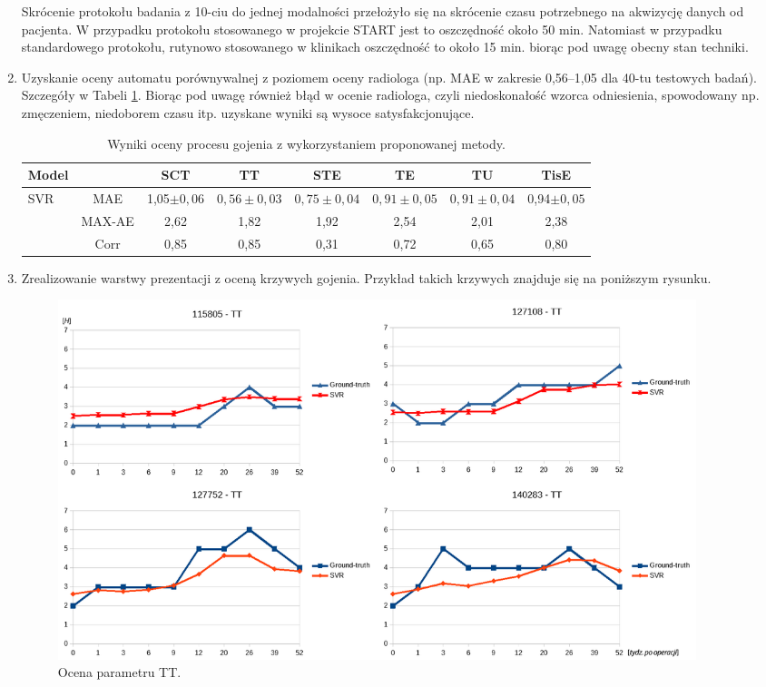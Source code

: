 \begin{enumerate}
	Skrócenie protokołu badania z 10-ciu do jednej modalności przełożyło się \linebreak na skrócenie czasu potrzebnego na akwizycję danych od pacjenta. W przypadku protokołu stosowanego w projekcie START jest to oszczędność około 50 min. Natomiast w przypadku standardowego protokołu, rutynowo stosowanego w klinikach oszczędność to około 15 min. biorąc pod uwagę obecny stan techniki. 
	\item Uzyskanie oceny automatu porównywalnej z poziomem oceny radiologa (np. MAE w zakresie 0,56--1,05 dla 40-tu testowych badań). Szczegóły w Tabeli \ref{tab:trainset}. Biorąc pod uwagę również błąd w ocenie radiologa, czyli niedoskonałość wzorca odniesienia, spowodowany np. zmęczeniem, niedoborem czasu itp. uzyskane wyniki są wysoce satysfakcjonujące.
		\vspace{0.5 cm}
	\begin{table}[h!]		
		\caption{Wyniki oceny procesu gojenia z wykorzystaniem proponowanej metody.}
		\vspace{-0.5 cm}
		\tiny
		\begin{center}
			\begin{tabular}{lc||c|c|c|c|c|c}
				\textbf{Model} & & \textbf{SCT} & \textbf{TT} & \textbf{STE} & \textbf{TE} & \textbf{TU} & \textbf{TisE}\\ 				
				\hline \hline
				\multirow{3}{*}{SVR}
				& MAE & 1,05$\pm0,06$ & $0,56\pm0,03$ & $0,75\pm0,04$ & $0,91\pm0,05$ & $0,91\pm0,04$ & 0,94$\pm0,05$\\
				& MAX-AE & 2,62 & 1,82 & 1,92 & 2,54 & 2,01 & 2,38 \\
				& Corr   & 0,85 & 0,85 & 0,31 & 0,72 & 0,65 & 0,80 \\
				\hline
			\end{tabular}
		\end{center}
		\label{tab:trainset}
	\end{table}	
\vspace{-0.5 cm}
	\item Zrealizowanie warstwy prezentacji z oceną krzywych gojenia. Przykład takich krzywych znajduje się na poniższym rysunku.
	 \begin{figure}[h!]
	 	\raggedleft
	 	\includegraphics[width=0.93\textwidth]{figures/TT.png}
	 	\caption{Ocena parametru TT.}\label{fig:TT}
	 \end{figure}
 

\end{enumerate}
